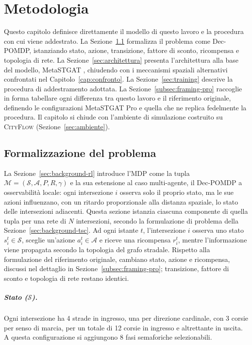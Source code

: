 \chapter{Metodologia}
\label{cap:tsc-modelli}

Questo capitolo definisce direttamente il modello di questo lavoro e la
procedura con cui viene addestrato. La Sezione~\ref{sec:formalizzazione}
formalizza il problema come Dec-POMDP, istanziando stato, azione,
transizione, fattore di sconto, ricompensa e topologia di rete. La
Sezione~\ref{sec:architettura} presenta l'architettura alla base del
modello, MetaSTGAT \citep{wang2022metastgat}, chiudendo con i meccanismi
spaziali alternativi confrontati nel Capitolo~\ref{cap:confronto}. La
Sezione~\ref{sec:training} descrive la procedura di addestramento
adottata. La Sezione~\ref{subsec:framing-pro} raccoglie in forma
tabellare ogni differenza tra questo lavoro e il riferimento originale,
definendo le configurazioni MetaSTGAT Pro e quella che ne replica
fedelmente la procedura. Il capitolo si chiude con l'ambiente di
simulazione costruito su \textsc{CityFlow} (Sezione~\ref{sec:ambiente}).

\section{Formalizzazione del problema}
\label{sec:formalizzazione}

La Sezione~\ref{sec:background-rl} introduce l'MDP come la tupla
$\mathcal{M} = (\mathcal{S}, \mathcal{A}, P, R, \gamma)$ e la sua
estensione al caso multi-agente, il Dec-POMDP a osservabilità locale: ogni
intersezione $i$ osserva solo il proprio stato, ma le sue azioni
influenzano, con un ritardo proporzionale alla distanza spaziale, lo stato
delle intersezioni adiacenti. Questa sezione istanzia ciascuna componente
di quella tupla per una rete di $N$ intersezioni, secondo la
formulazione di problema della Sezione~\ref{sec:background-tsc}. Ad ogni
istante $t$, l'intersezione $i$ osserva uno stato $s_i^t \in \mathcal{S}$,
sceglie un'azione $a_i^t \in \mathcal{A}$ e riceve una ricompensa $r_i^t$,
mentre l'informazione viene propagata secondo la topologia del grafo
stradale. Rispetto alla formulazione del riferimento originale, cambiano
stato, azione e ricompensa, discussi nel dettaglio in
Sezione~\ref{subsec:framing-pro}; transizione, fattore di sconto e
topologia di rete restano identici.

\paragraph{Stato ($\mathcal{S}$).} Ogni intersezione ha 4 strade in ingresso,
una per direzione cardinale, con 3 corsie per senso di marcia, per un totale
di 12 corsie in ingresso e altrettante in uscita. A
questa configurazione si aggiungono 8 fasi semaforiche selezionabili.

